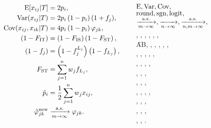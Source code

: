 

  \begin{frame}
    \begin{columns}[T]
      \begin{column}{3.3cm}
        \sampleGenMat
      \end{column}
      \begin{column}{6cm}
        \begin{align*}
          \E[\xij|T] &= 2 \pit
          , \\
          \Var(\xij|T) &= 2 \pit \left( 1-\pit \right) (1 + \ft)
          , \\
          \Cov(\xij,\xij[k]|T) &= 4 \pit \left( 1-\pit \right) \kt
          , \\
          \left( 1-\Fit \right) &= \left( 1-\Fis \right) \left( 1-\Fst \right)
          , \\
          \left( 1-\ft \right) &= \left( 1-\fl \right) \left( 1-\fs \right)
          , \\
          \Fst &= \sum_{j=1}^n w_j \fs
          , \\
          \pith &= \frac{1}{2}\sum_{j=1}^n w_j \xij
          , \\
          \ktHatNew &\toas \kt
          .
        \end{align*}
      \end{column}
      \begin{column}{4.5cm}
        $\operatorname{E}, \operatorname{Var}, \operatorname{Cov},$ \\
        $\operatorname{round}, \operatorname{sgn}, \operatorname{logit},$ \\
        $\xrightarrow[m \rightarrow \infty]{\text{a.s.}}, \xrightarrow[n \rightarrow \infty]{}, \xrightarrow[n,m \rightarrow \infty]{\text{a.s.}},$ \\
        \xij, \pit, \pith, \Fst, \Fit, \Fis, \\
        \f{A}{B}, \ft, \fl, \fs,
        \kt, \kl, \\ \ks,
        \fpw,
        \Rst, \PhiSt, \Gst, \\ \GstPrime, \FstHatSample,
        \FstHatIs, \FstHatWc, \\ \FstHatHudson, \FstHatHudsonK,
        \ktHat, \\ \ftHat, \ftHatII, \ftHatIII, \\
        \FstHat, \FstHatPrime, \FstHatPrimeDbl,
        \ktHatPreadj, \\ \ktHatPreadjMin, \ktHatNew, \ftHatNew, \\ \FstHatNew,
        \klHatBeagle, \flHatBeagle, \\
        \mav, \AMin, \AMinHat
        .
      \end{column}
    \end{columns}
  \end{frame}

